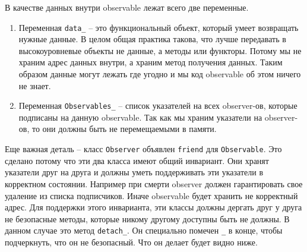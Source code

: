 В качестве данных внутри observable лежат всего две переменные.
\begin{enumerate}
\item Переменная \verb"data_" -- это функциональный объект, который умеет возвращать нужные данные.
В целом общая практика такова, что лучше передавать в высокоуровневые объекты не данные, а методы или функторы.
Потому мы не храним адрес данных внутри, а храним метод получения данных.
Таким образом данные могут лежать где угодно и мы код observable об этом ничего не знает.

\item Переменная \verb"Observables_" -- список указателей на всех observer-ов, которые подписаны на данную observable.
Так как мы храним указатели на observer-ов, то они должны быть не перемещаемыми в памяти.
\end{enumerate}
Еще важная деталь -- класс \verb"Observer" объявлен \verb"friend" для \verb"Observable".
Это сделано потому что эти два класса имеют общий инвариант.
Они хранят указатели друг на друга и должны уметь поддерживать эти указатели в корректном состоянии.
Например при смерти observer должен гарантировать свое удаление из списка подписчиков.
Иначе observable будет хранить не корректный адрес.
Для поддержки этого инварианта, эти классы должны дергать друг у друга не безопасные методы, которые никому другому доступны быть не должны.
В данном случае это метод \verb"detach_".
Он специально помечен \verb"_" в конце, чтобы подчеркнуть, что он не безопасный.
Что он делает будет видно ниже.

